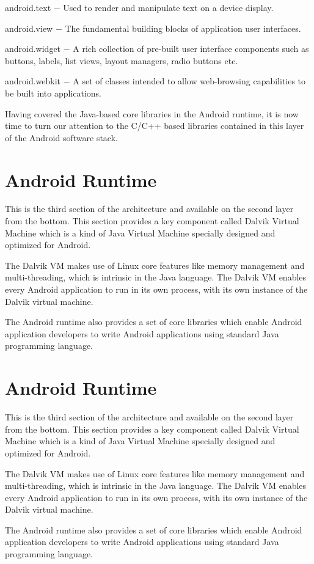\documentclass{fisatproject}
\begin{document}
android.text − Used to render and manipulate text on a device display.

android.view − The fundamental building blocks of application user interfaces.

android.widget − A rich collection of pre-built user interface components such as buttons, labels, list views, layout managers, radio buttons etc.

android.webkit − A set of classes intended to allow web-browsing capabilities to be built into applications.

Having covered the Java-based core libraries in the Android runtime, it is now time to turn our attention to the C/C++ based libraries contained in this layer of the Android software stack.
\section{Android Runtime}
This is the third section of the architecture and available on the second layer from the bottom. This section provides a key component called Dalvik Virtual Machine which is a kind of Java Virtual Machine specially designed and optimized for Android.

The Dalvik VM makes use of Linux core features like memory management and multi-threading, which is intrinsic in the Java language. The Dalvik VM enables every Android application to run in its own process, with its own instance of the Dalvik virtual machine.

The Android runtime also provides a set of core libraries which enable Android application developers to write Android applications using standard Java programming language.
\section{Android Runtime}
This is the third section of the architecture and available on the second layer from the bottom. This section provides a key component called Dalvik Virtual Machine which is a kind of Java Virtual Machine specially designed and optimized for Android.

The Dalvik VM makes use of Linux core features like memory management and multi-threading, which is intrinsic in the Java language. The Dalvik VM enables every Android application to run in its own process, with its own instance of the Dalvik virtual machine.

The Android runtime also provides a set of core libraries which enable Android application developers to write Android applications using standard Java programming language.
\end{document}
